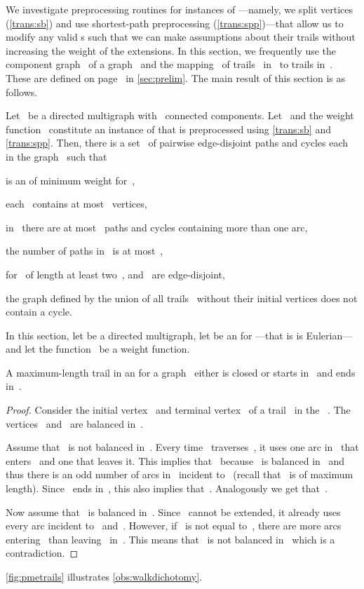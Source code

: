 We investigate preprocessing routines for instances of \pWMEEs{}---namely, we split vertices (\autoref{trans:sb}) and use shortest-path preprocessing (\autoref{trans:spp})---that allow us to modify any valid \EE s such that we can make assumptions about their trails without increasing the weight of the extensions. In this section, we frequently use the component graph~ of a graph~ and the mapping~ of trails~ in~ to trails in~. These are defined on page~\pageref{def:meta} in \autoref{sec:prelim}. The main result of this section is as follows.
\newcommand{\eestructuretheorem}{Let~ be a directed multigraph with~ connected components. Let~ and the weight function~ constitute an instance of \pWMEE{} that is preprocessed using \autoref{trans:sb} and \autoref{trans:spp}. Then, there is a set~ of pairwise edge-disjoint paths and cycles each in the graph~ such that
  \begin{lemenum}
  \item  is an \EE{} of minimum weight for~,\label{enu:ees5}
\item each~ contains at most~ vertices,\label{enu:ees2}
  \item in~ there are at most~ paths and cycles containing more than one arc,\label{enu:ees3}
  \item the number of paths in~ is at most~,\label{enu:ees4}
  \item for~ of length at least two~, and~ are edge-disjoint,\label{enu:ees7}
  \item the graph defined by the union of all trails~ without their initial vertices does not contain a cycle. \label{enu:ees6}
  \end{lemenum}
}
\begin{theorem}\label{the:eestructure}
  \eestructuretheorem
\end{theorem}
In this section, let  be a directed multigraph, let  be an \EE{} for ---that is  is Eulerian---and let the function~ be a weight function.
\begin{observation}
  \label{obs:walkdichotomy}
  A maximum-length trail in an \EE{} for a graph~ either is closed or starts in~ and ends in~.
\end{observation}
\begin{proof}
  Consider the initial vertex~ and terminal vertex~ of a trail~ in the \EE~. The vertices~ and~ are balanced in~. 

  Assume that~ is not balanced in~. Every time~ traverses~, it uses one arc in~ that enters~ and one that leaves it. This implies that~ because~ is balanced in~ and thus there is an odd number of arcs in~ incident to~ (recall that~ is of maximum length). Since~ ends in~, this also implies that~. Analogously we get that~.
  
  Now assume that~ is balanced in~. Since~ cannot be extended, it already uses every arc incident to~ and~. However, if~ is not equal to~, there are more arcs entering~ than leaving~ in~. This means that~ is not balanced in~ which is a contradiction.
\end{proof}
\autoref{fig:pmetrails} illustrates \autoref{obs:walkdichotomy}.

